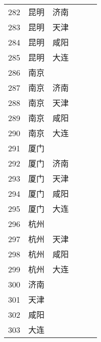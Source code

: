 \begin{footnotesize}
\begin{longtable}{cccccc}
        282	& 昆明  & 济南 \\
        283	& 昆明  & 天津 \\
        284	& 昆明  & 咸阳 \\
        285	& 昆明  & 大连 \\
        286	& 南京 \\
        287	& 南京  & 济南 \\
        288	& 南京  & 天津 \\
        289	& 南京  & 咸阳 \\
        290	& 南京  & 大连 \\
        291	& 厦门 \\
        292	& 厦门  & 济南 \\
        293	& 厦门  & 天津 \\
        294	& 厦门  & 咸阳 \\
        295	& 厦门  & 大连 \\
        296	& 杭州 \\
        297	& 杭州  & 天津 \\
        298	& 杭州  & 咸阳 \\
        299	& 杭州  & 大连 \\
        300	& 济南 \\
        301	& 天津 \\
        302	& 咸阳 \\
        303	& 大连 \\
    \end{longtable}
\end{footnotesize}